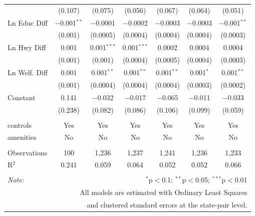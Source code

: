 \begin{table}[!htbp]
\begin{tabular}{@{\extracolsep{5pt}}lcccccc}
  & (0.107) & (0.075) & (0.056) & (0.067) & (0.064) & (0.051) \\ 
  Ln Educ Diff & $-$0.001$^{**}$ & $-$0.0001 & $-$0.0002 & $-$0.0003 & $-$0.0003 & $-$0.001$^{**}$ \\ 
  & (0.001) & (0.0005) & (0.0004) & (0.0004) & (0.0004) & (0.0003) \\ 
  Ln Hwy Diff & 0.001 & 0.001$^{***}$ & 0.001$^{***}$ & 0.0002 & 0.0004 & 0.0004 \\ 
  & (0.001) & (0.001) & (0.0004) & (0.0005) & (0.0004) & (0.0003) \\ 
  Ln Welf. Diff & 0.001 & 0.001$^{**}$ & 0.001$^{**}$ & 0.001$^{**}$ & 0.001$^{*}$ & 0.001$^{**}$ \\ 
  & (0.001) & (0.0004) & (0.0004) & (0.0004) & (0.0003) & (0.0002) \\ 
  Constant & 0.141 & $-$0.032 & $-$0.017 & $-$0.065 & $-$0.011 & $-$0.033 \\ 
  & (0.238) & (0.082) & (0.086) & (0.106) & (0.099) & (0.059) \\ 
 \hline \\[-1.8ex] 
controls & Yes & Yes & Yes & Yes & Yes & Yes \\ 
amenities & No & No & No & No & No & No \\ 
\hline \\[-1.8ex] 
Observations & 100 & 1,236 & 1,237 & 1,241 & 1,236 & 1,233 \\ 
R$^{2}$ & 0.241 & 0.059 & 0.064 & 0.052 & 0.052 & 0.066 \\ 
\hline 
\hline \\[-1.8ex] 
\textit{Note:}  & \multicolumn{6}{r}{$^{*}$p$<$0.1; $^{**}$p$<$0.05; $^{***}$p$<$0.01} \\ 
 & \multicolumn{6}{r}{All models are estimated with Ordinary Least Squares} \\ 
 & \multicolumn{6}{r}{and clustered standard errors at the state-pair level.} \\ 
\end{tabular} 
\end{table} 
